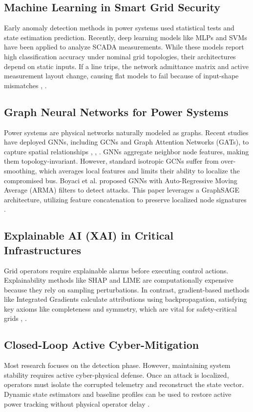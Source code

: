 \documentclass[conference]{IEEEtran}
\begin{document}
\subsection{Machine Learning in Smart Grid Security}
Early anomaly detection methods in power systems used statistical tests and state estimation prediction. Recently, deep learning models like MLPs and SVMs have been applied to analyze SCADA measurements. While these models report high classification accuracy under nominal grid topologies, their architectures depend on static inputs. If a line trips, the network admittance matrix and active measurement layout change, causing flat models to fail because of input-shape mismatches \cite{b5}, \cite{b6}.

\subsection{Graph Neural Networks for Power Systems}
Power systems are physical networks naturally modeled as graphs. Recent studies have deployed GNNs, including GCNs and Graph Attention Networks (GATs), to capture spatial relationships \cite{b2}, \cite{b12}, \cite{b14}. GNNs aggregate neighbor node features, making them topology-invariant. However, standard isotropic GCNs suffer from over-smoothing, which averages local features and limits their ability to localize the compromised bus. Boyaci et al. \cite{b10} proposed GNNs with Auto-Regressive Moving Average (ARMA) filters to detect attacks. This paper leverages a GraphSAGE architecture, utilizing feature concatenation to preserve localized node signatures \cite{b8}.

\subsection{Explainable AI (XAI) in Critical Infrastructures}
Grid operators require explainable alarms before executing control actions. Explainability methods like SHAP and LIME are computationally expensive because they rely on sampling perturbations. In contrast, gradient-based methods like Integrated Gradients calculate attributions using backpropagation, satisfying key axioms like completeness and symmetry, which are vital for safety-critical grids \cite{b7}, \cite{b15}.

\subsection{Closed-Loop Active Cyber-Mitigation}
Most research focuses on the detection phase. However, maintaining system stability requires active cyber-physical defense. Once an attack is localized, operators must isolate the corrupted telemetry and reconstruct the state vector. Dynamic state estimators and baseline profiles can be used to restore active power tracking without physical operator delay \cite{b13}.
\end{document}
